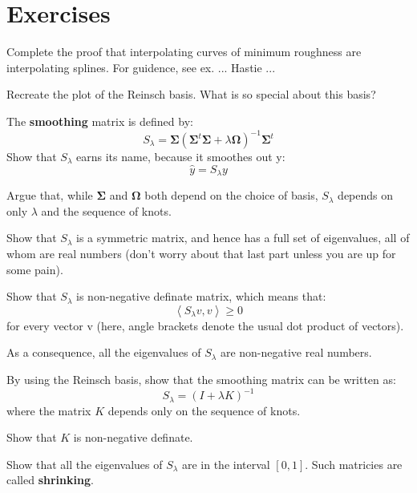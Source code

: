 \section{Exercises}
%
%
\begin{frame}
  Complete the proof that interpolating curves of minimum roughness are interpolating splines.  For guidence, see ex. ... Hastie ...
\end{frame}
%
%
\begin{frame}
  Recreate the plot of the Reinsch basis.  What is so special about this basis?
\end{frame}
%
%
\begin{frame}
  The \textbf{smoothing} matrix is defined by:
  $$ S_{\lambda} = \mathbf{\Sigma} ( \mathbf{\Sigma}^t \mathbf{\Sigma} + \lambda \mathbf{\Omega} )^{-1} \mathbf{\Sigma}^t $$
  Show that $S_{\lambda}$ earns its name, because it smoothes out y:
  $$ \hat{y} = S_{\lambda} y $$
\end{frame}
%
%
\begin{frame}
  Argue that, while $\mathbf{\Sigma}$ and $\mathbf{\Omega}$ both depend on the choice of basis,  $S_{\lambda}$ depends on only $\lambda$ and the sequence of knots.
\end{frame}
%
%
\begin{frame}
  Show that $S_{\lambda}$ is a symmetric matrix, and hence has a full set of eigenvalues, all of whom are real numbers (don't worry about that last part unless you are up for some pain).
\end{frame}
%
%
\begin{frame}
  Show that $S_{\lambda}$ is non-negative definate matrix, which means that:
  $$ \left< S_{\lambda} v, v \right> \geq 0 $$
for every vector v (here, angle brackets denote the usual dot product of vectors).

  As a consequence, all the eigenvalues of $S_{\lambda}$ are non-negative real numbers.
\end{frame}
%
%
\begin{frame}
  By using the Reinsch basis, show that the smoothing matrix can be written as:
  $$ S_{\lambda} = (I + \lambda K)^{-1} $$
where the matrix $K$ depends only on the sequence of knots.
\end{frame}
%
%
\begin{frame}
  Show that $K$ is non-negative definate.
\end{frame}
%
%
\begin{frame}
  Show that all the eigenvalues of $S_{\lambda}$ are in the interval $[0, 1]$.  Such matricies are called \textbf{shrinking}.
\end{frame}
